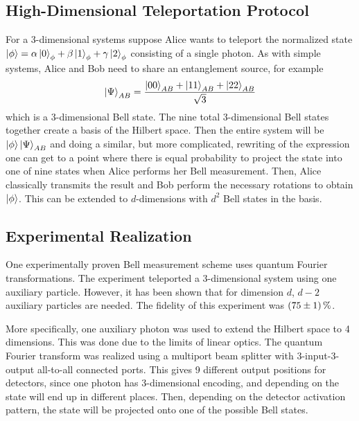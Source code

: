 \subsection{High-Dimensional Teleportation Protocol}
For a 3-dimensional systems suppose Alice wants to teleport the normalized state $\ket{\phi} = \alpha \ket{0}_\phi + \beta \ket{1}_\phi + \gamma \ket{2}_\phi$ consisting of a single photon. As with simple systems, Alice and Bob need to share an entanglement source, for example 
\begin{equation}
    \ket{\Psi}_{AB} = \frac{\ket{00}_{AB} + \ket{11}_{AB} + \ket{22}_{AB}}{\sqrt{3}}
\end{equation}
which is a 3-dimensional Bell state. The nine total 3-dimensional Bell states together create a basis of the Hilbert space. Then the entire system will be $\ket{\phi}\ket{\Psi}_{AB}$ and doing a similar, but more complicated, rewriting of the expression one can get to a point where there is equal probability to project the state into one of nine states when Alice performs her Bell measurement. Then, Alice classically transmits the result and Bob perform the necessary rotations to obtain $\ket{\phi}$. This can be extended to $d$-dimensions with $d^2$ Bell states in the basis. \cite{Luo:2019}

\subsection{Experimental Realization}
One experimentally proven Bell measurement scheme uses quantum Fourier transformations. The experiment teleported a 3-dimensional system using one auxiliary particle. However, it has been shown that for dimension $d$, $d-2$ auxiliary particles are needed. The fidelity of this experiment was $\SI{75\pm 1}{\percent}$. \cite{Luo:2019}

More specifically, one auxiliary photon was used to extend the Hilbert space to 4 dimensions. This was done due to the limits of linear optics. The quantum Fourier transform was realized using a multiport beam splitter with 3-input-3-output all-to-all connected ports. This gives 9 different output positions for detectors, since one photon has 3-dimensional encoding, and depending on the state will end up in different places. Then, depending on the detector activation pattern, the state will be projected onto one of the possible Bell states. \cite{Luo:2019}